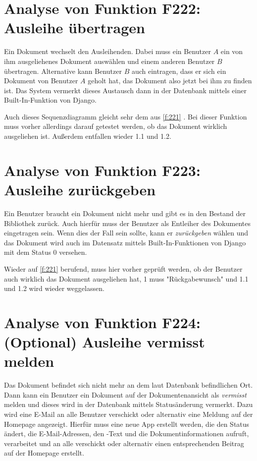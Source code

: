 \section{Analyse von Funktion F222: Ausleihe übertragen}
\label{f:222}
Ein Dokument wechselt den Ausleihenden. Dabei muss ein Benutzer $A$ ein von ihm ausgeliehenes Dokument auswählen und einem anderen Benutzer $B$ übertragen. Alternative kann Benutzer $B$ auch eintragen, dass er sich ein Dokument von Benutzer $A$ geholt hat, das Dokument also jetzt bei ihm zu finden ist. Das System vermerkt dieses Austausch dann in der Datenbank mittels einer Built-In-Funktion von Django. 

Auch dieses Sequenzdiagramm gleicht sehr dem aus \ref{f:221} . Bei dieser Funktion muss vorher allerdings darauf getestet werden, ob das Dokument wirklich ausgeliehen ist. Außerdem entfallen wieder 1.1 und 1.2.

\section{Analyse von Funktion F223: Ausleihe zurückgeben}
\label{f:223}
Ein Benutzer braucht ein Dokument nicht mehr und gibt es in den Bestand der Bibliothek zurück. Auch hierfür muss der Benutzer als Entleiher des Dokumentes eingetragen sein. Wenn dies der Fall sein sollte, kann er \emph{zurückgeben} wählen und das Dokument wird auch im Datensatz mittels Built-In-Funktionen von Django mit dem Status 0 versehen.

Wieder auf \ref{f:221}  berufend, muss hier vorher geprüft werden, ob der Benutzer auch wirklich das Dokument ausgeliehen hat, 1 muss "Rückgabewunsch" und 1.1 und 1.2 wird wieder weggelassen.

\section{Analyse von Funktion F224: (Optional) Ausleihe vermisst melden}
\label{f:224}
Das Dokument befindet sich nicht mehr an dem laut Datenbank befindlichen Ort. Dann kann ein Benutzer ein Dokument auf der Dokumentenansicht als \emph{vermisst} melden und dieses wird in der Datenbank mittels Statusänderung vermerkt. Dazu wird eine E-Mail an alle Benutzer verschickt oder alternativ eine Meldung auf der Homepage angezeigt. Hierfür muss eine neue App erstellt werden, die den Status ändert, die E-Mail-Adressen, den -Text und die Dokumentinformationen aufruft, verarbeitet und an alle verschickt oder alternativ einen entsprechenden Beitrag auf der Homepage erstellt.

